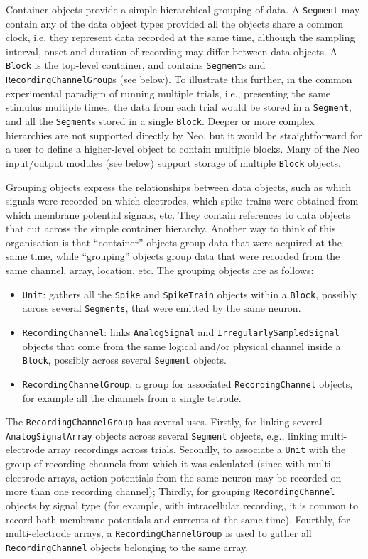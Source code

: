 \documentclass{frontiers}
\begin{document}
Container objects provide a simple hierarchical grouping of data. 
A \lstinline`Segment` may contain any of the data object types provided all the objects share a common clock, i.e. they represent data recorded at the same time, although the sampling interval, onset and duration of recording may differ between data objects.
A \lstinline`Block` is the top-level container, and contains \lstinline`Segment`s and \lstinline`RecordingChannelGroup`s (see below).
To illustrate this further, in the common experimental paradigm of running multiple trials, i.e., presenting the same stimulus multiple times, the data from each trial would be stored in a \lstinline`Segment`, and all the \lstinline`Segment`s stored in a single \lstinline`Block`. Deeper or more complex hierarchies are not supported directly by Neo, but it would be straightforward for a user to define a higher-level object to contain multiple blocks. Many of the Neo input/output modules (see below) support storage of multiple \lstinline`Block` objects.

Grouping objects express the relationships between data objects, such as which signals were recorded on which electrodes, which spike trains were obtained from which membrane potential signals, etc.
They contain references to data objects that cut across the simple container hierarchy. Another way to think of this organisation is that ``container'' objects group data that were acquired at the same time, while ``grouping'' objects group data that were recorded from the same channel, array, location, etc. 
The grouping objects are as follows:

\begin{itemize}
\item \lstinline`Unit`: gathers all the \lstinline`Spike` and \lstinline`SpikeTrain` objects within a \lstinline`Block`, possibly across several \lstinline`Segments`, that were emitted by the same neuron.
\item \lstinline`RecordingChannel`: links \lstinline`AnalogSignal` and \lstinline`IrregularlySampledSignal` objects that come from the same logical and/or physical channel inside a \lstinline`Block`, possibly across several \lstinline`Segment` objects.
\item \lstinline`RecordingChannelGroup`: a group for associated \lstinline`RecordingChannel` objects, for example all the channels from a single tetrode.
\end{itemize}

The  \lstinline`RecordingChannelGroup` has several uses. 
Firstly, for linking several \lstinline`AnalogSignalArray` objects across several \lstinline`Segment` objects, e.g., linking multi-electrode array recordings across trials.
Secondly, to associate a \lstinline`Unit` with the group of recording channels from which it was calculated (since with multi-electrode arrays, action potentials from the same neuron may be recorded on more than one recording channel);
Thirdly, for grouping \lstinline`RecordingChannel` objects by signal type (for example, with intracellular recording, it is common to record both membrane potentials and currents at the same time).
Fourthly, for multi-electrode arrays, a \lstinline`RecordingChannelGroup` is used to gather all \lstinline`RecordingChannel` objects belonging to the same array.
\end{document}
